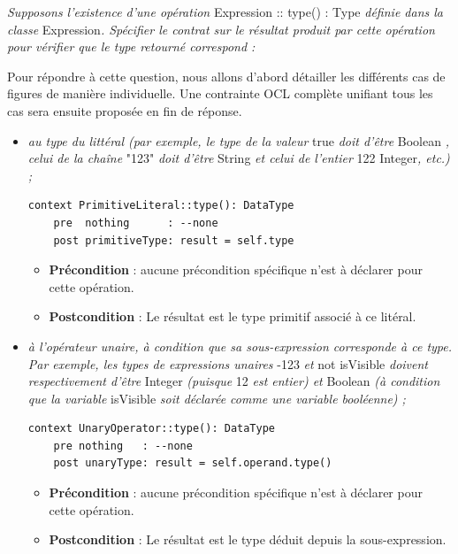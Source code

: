 \documentclass[oneside,a4paper]{book}
\begin{document}
\nopagebreak 

\textit{Supposons l'existence d'une opération} Expression :: type() : Type \textit{définie dans la classe} Expression\textit{. Spécifier le contrat sur le résultat produit par cette opération pour vérifier que le type retourné correspond :}\newline

Pour répondre à cette question, nous allons d'abord détailler les différents cas de figures de manière individuelle. Une contrainte OCL complète unifiant tous les cas sera ensuite proposée en fin de réponse.

\begin{itemize}
    \item \textit{au type du littéral (par exemple, le type de la valeur} true \textit{doit d'être} Boolean \textit{, celui de la chaîne} "123" \textit{doit d'être} String \textit{et celui de l'entier} 122 Integer\textit{, etc.) ;}
    \begin{lstlisting}
context PrimitiveLiteral::type(): DataType
    pre  nothing      : --none
    post primitiveType: result = self.type
    \end{lstlisting}
    \begin{itemize}
        \item \textbf{Précondition} : aucune précondition spécifique n'est à déclarer pour cette opération.
        \item \textbf{Postcondition} : Le résultat est le type primitif associé à ce litéral.
    \end{itemize}
    

    \item \textit{à l'opérateur unaire, à condition que sa sous-expression corresponde à ce type. Par exemple, les types de expressions unaires} -123 \textit{et} not isVisible \textit{doivent respectivement d'être} Integer \textit{(puisque} 12 \textit{est entier) et} Boolean \textit{(à condition que la variable} isVisible \textit{soit déclarée comme une variable booléenne) ;}
    \begin{lstlisting}
context UnaryOperator::type(): DataType
    pre nothing   : --none
    post unaryType: result = self.operand.type()
    \end{lstlisting}
    \begin{itemize}
        \item \textbf{Précondition} : aucune précondition spécifique n'est à déclarer pour cette opération.
        \item \textbf{Postcondition} : Le résultat est le type déduit depuis la sous-expression.
    \end{itemize}
    

\end{itemize}
\end{document}

